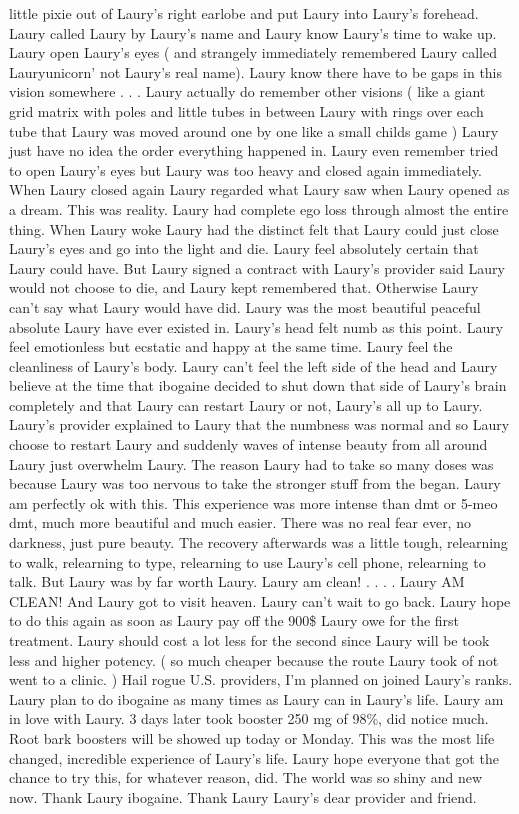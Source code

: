 \documentclass[12pt]{book}
\begin{document}
little pixie out of Laury's right earlobe and put Laury into Laury's forehead. Laury called Laury by Laury's name and Laury know Laury's time to wake up. Laury open Laury's eyes ( and strangely immediately remembered Laury called Lauryunicorn' not Laury's real name). Laury know there have to be gaps in this vision somewhere . . .  Laury actually do remember other visions ( like a giant grid matrix with poles and little tubes in between Laury with rings over each tube that Laury was moved around one by one like a small childs game ) Laury just have no idea the order everything happened in. Laury even remember tried to open Laury's eyes but Laury was too heavy and closed again immediately. When Laury closed again Laury regarded what Laury saw when Laury opened as a dream. This was reality. Laury had complete ego loss through almost the entire thing. When Laury woke Laury had the distinct felt that Laury could just close Laury's eyes and go into the light and die. Laury feel absolutely certain that Laury could have. But Laury signed a contract with Laury's provider said Laury would not choose to die, and Laury kept remembered that. Otherwise Laury can't say what Laury would have did. Laury was the most beautiful peaceful absolute Laury have ever existed in. Laury's head felt numb as this point. Laury feel emotionless but ecstatic and happy at the same time. Laury feel the cleanliness of Laury's body. Laury can't feel the left side of the head and Laury believe at the time that ibogaine decided to shut down that side of Laury's brain completely and that Laury can restart Laury or not, Laury's all up to Laury. Laury's provider explained to Laury that the numbness was normal and so Laury choose to restart Laury and suddenly waves of intense beauty from all around Laury just overwhelm Laury. The reason Laury had to take so many doses was because Laury was too nervous to take the stronger stuff from the began. Laury am perfectly ok with this. This experience was more intense than dmt or 5-meo dmt, much more beautiful and much easier. There was no real fear ever, no darkness, just pure beauty. The recovery afterwards was a little tough, relearning to walk, relearning to type, relearning to use Laury's cell phone, relearning to talk. But Laury was by far worth Laury. Laury am clean! . . .  . Laury AM CLEAN! And Laury got to visit heaven. Laury can't wait to go back. Laury hope to do this again as soon as Laury pay off the 900\$ Laury owe for the first treatment. Laury should cost a lot less for the second since Laury will be took less and higher potency. ( so much cheaper because the route Laury took of not went to a clinic. ) Hail rogue U.S. providers, I'm planned on joined Laury's ranks. Laury plan to do ibogaine as many times as Laury can in Laury's life. Laury am in love with Laury. 3 days later took booster 250 mg of 98\%, did notice much. Root bark boosters will be showed up today or Monday. This was the most life changed, incredible experience of Laury's life. Laury hope everyone that got the chance to try this, for whatever reason, did. The world was so shiny and new now. Thank Laury ibogaine. Thank Laury Laury's dear provider and friend.
\end{document}
